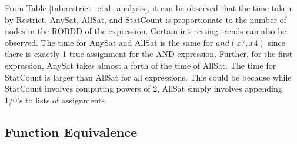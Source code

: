 \documentclass[a4paper, titlepage, 12pt]{article}
\numberwithin{equation}{section}
\begin{document}
\begin{itemize}
                    \begin{table}[!tbh]
                        \centering
                        \caption{Time analysis of Restrict, AnySat, AllSat and StatCount.}
                        \label{tab:restrict_etal_analysis}
                    \end{table}

                    From Table \ref{tab:restrict_etal_analysis}, it can be observed that the time taken by Restrict, AnySat, AllSat, and StatCount is proportionate to the number of nodes in the ROBDD of the expression.
                    Certain interesting trends can also be observed.
                    The time for AnySat and AllSat is the same for $and(x7, x4)$ since there is exactly 1 true assignment for the AND expression.
                    Further, for the first expression, AnySat takes almost a forth of the time of AllSat.
                    The time for StatCount is larger than AllSat for all expressions.
                    This could be because while StatCount involves computing powers of 2, AllSat simply involves appending 1/0's to lists of assignments.

            \end{itemize}
        
        \subsection{Function Equivalence}
\end{document}
